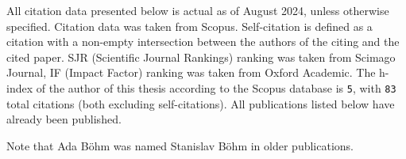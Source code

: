 All citation data presented below is actual as of August 2024, unless otherwise
specified. Citation data was taken from Scopus.
Self-citation is defined as a citation with a non-empty intersection between the authors of the citing and the cited paper.
SJR (Scientific Journal Rankings) ranking was taken from Scimago Journal,
IF (Impact Factor) ranking was taken from Oxford Academic.
The h-index of the author of this thesis according to the Scopus database is \texttt{5},
with \texttt{83} total citations (both excluding self-citations). All
publications listed below have already been published.

Note that Ada Böhm was named Stanislav Böhm in older publications.

